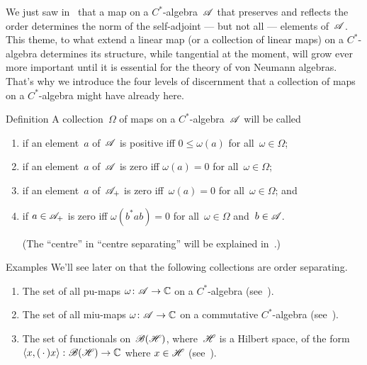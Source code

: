 \documentclass[a]{subfiles}
\begin{document}
\begin{parsec}%
\begin{point}%
We just saw in~ that a
map on a $C^*$-algebra~$\mathscr{A}$
that preserves and reflects the order
determines the norm of the self-adjoint
--- but not all --- elements of~$\mathscr{A}$.
This theme, to what extend a linear map
(or a collection of linear maps)
on a $C^*$-algebra
determines its structure,
while tangential at the moment,
will
grow ever more important 
until it is essential for the theory 
of von Neumann algebras.
That's why we introduce
the four levels
of discernment
that a collection of maps on a $C^*$-algebra
might have already here.
\end{point}
\begin{point}[separating]{Definition}%
A collection~$\Omega$ of maps on a $C^*$-algebra~$\mathscr{A}$
will be called
\begin{enumerate}
\item
{}%
if an element~$a$ of~$\mathscr{A}$
is positive iff $0\leq \omega(a)$
for all~$\omega\in \Omega$;
\item
{}%
if an element~$a$ of~$\mathscr{A}$
is zero iff $\omega(a)=0$ for all~$\omega\in\Omega$;
\item
{} if an element~$a$ of~$\mathscr{A}_+$%
is zero iff~$\omega(a)=0$ for all~$\omega\in\Omega$; and
\item
{}%
if $a\in\mathscr{A}_+$
is zero iff $\omega(b^*ab)=0$ for all~$\omega\in\Omega$
and~$b\in \mathscr{A}$.

(The ``centre'' in ``centre separating''
will be explained in~.)
\end{enumerate}
\end{point}
\begin{point}{Examples}%
We'll see later on that the following
collections
are order separating.
\begin{enumerate}
\item
The set of all pu-maps $\omega\colon \mathscr{A}\to\mathbb{C}$
on a $C^*$-algebra
(see~).
\item
The set of all miu-maps $\omega\colon \mathscr{A}\to\mathbb{C}$
on a commutative $C^*$-algebra
(see~).
\item
The set of functionals on~$\mathscr{B}(\mathscr{H})$,
where~$\mathscr{H}$ is a Hilbert space,
of the form 
$\left<x,(\,\cdot\,)x\right>
\colon \mathscr{B}(\mathscr{H})\to\mathbb{C}$ where $x\in \mathscr{H}$
(see~).


\end{enumerate}
\end{point}
\end{parsec}
\end{document}
